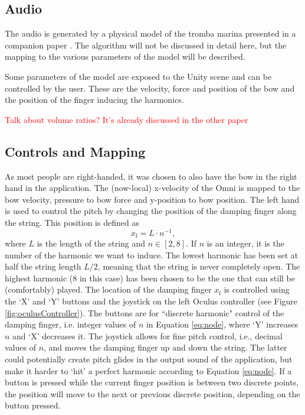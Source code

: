\documentclass[dvipsnames, pdftex]{article}
\def\SWcomment[#1]{\textcolor{Red}{#1}}
\begin{document}
\subsection{Audio}
The audio is generated by a physical model of the tromba marina presented in a companion paper \cite{Willemsen2020}. The algorithm will not be discussed in detail here, but the mapping to the various parameters of the model will be described. 

Some parameters of the model are exposed to the Unity scene and can be controlled by the user. These are the velocity, force and position of the bow and the position of the finger inducing the harmonics.

\SWcomment[Talk about volume ratios? It's already discussed in the other paper]

\subsection{Controls and Mapping}\label{sec:controls}
As most people are right-handed, it was chosen to also have the bow in the right hand in the application. The (now-local) x-velocity of the Omni is mapped to the bow velocity, pressure to bow force and y-position to bow position. The left hand is used to control the pitch by changing the position of the damping finger along the string. This position is defined as  
\begin{equation}\label{eq:node}
    x_\text{f} = L\cdot n^{-1},
\end{equation}
where $L$ is the length of the string and $n \in [2,8]$. If $n$ is an integer, it is the number of the harmonic we want to induce. The lowest harmonic has been set at half the string length $L/2$, meaning that the string is never completely open. The highest harmonic (8 in this case) has been chosen to be the one that can still be (comfortably) played. The location of the damping finger $x_\text{f}$ is controlled using the `X' and `Y' buttons and the joystick on the left Oculus controller (see Figure \ref{fig:oculusController}). The buttons are for ``discrete harmonic" control of the damping finger, i.e. integer values of $n$ in Equation \eqref{eq:node}, where `Y' increases $n$ and `X' decreases it. The joystick allows for fine pitch control, i.e., decimal values of $n$,  and moves the damping finger up and down the string. The latter could potentially create pitch glides in the output sound of the application, but make it harder to `hit' a perfect harmonic according to Equation \eqref{eq:node}. If a button is pressed while the current finger position is between two discrete points, the position will move to the next or previous discrete position, depending on the button pressed.
\end{document}
